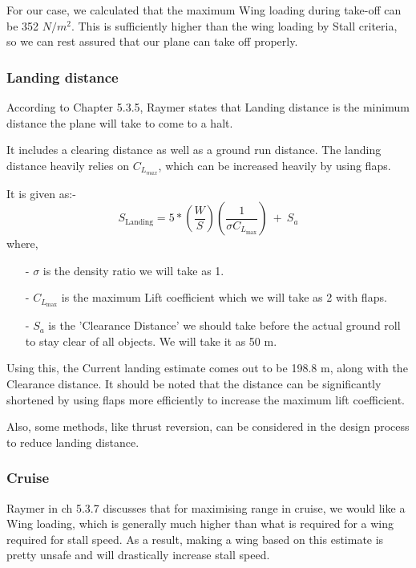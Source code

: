 \documentclass[12 pt]{article}
\begin{document}
For our case, we calculated that the maximum Wing loading during take-off can be 352 $N/m^2$. This is sufficiently higher than the wing loading by Stall criteria, so we can rest assured that our plane can take off properly.

\subsubsection{Landing distance}

According to \cite{Raymer.2006} Chapter 5.3.5, Raymer states that Landing distance is the minimum distance the plane will take to come to a halt.

It includes a clearing distance as well as a ground run distance. The landing distance heavily relies on $C_{L_{max}}$, which can be increased heavily by using flaps.

It is given as:- 
$$ S_{\text{Landing}} = 5*\left( \frac{W}{S} \right) \left( \frac{1}{\sigma C_{L_{\text{max}}}} \right) \: + \: S_a$$
where,
\begin{itemize}
    \item [-] $\sigma$ is the density ratio we will take as 1.
    \item[-] $C_{L_{\text{max}}} $ is the maximum Lift coefficient which we will take as 2 with flaps.
    \item[-] $S_a$ is the 'Clearance Distance' we should take before the actual ground roll to stay clear of all objects. We will take it as 50 m.
\end{itemize}

Using this, the Current landing estimate comes out to be 198.8 m, along with the Clearance distance. It should be noted that the distance can be significantly shortened by using flaps more efficiently to increase the maximum lift coefficient.

Also, some methods, like thrust reversion, can be considered in the design process to reduce landing distance.


\subsubsection{Cruise}

Raymer in \cite{Raymer.2006} ch 5.3.7 discusses that for maximising range in cruise, we would like a Wing loading, which is generally much higher than what is required for a wing required for stall speed. As a result, making a wing based on this estimate is pretty unsafe and will drastically increase stall speed.
\end{document}
